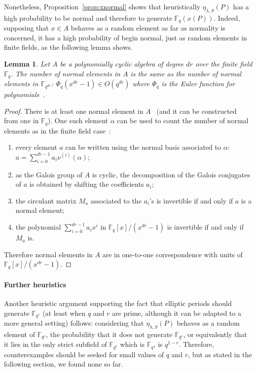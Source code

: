 \documentclass[12pt]{article}
\theoremstyle{plain}
\newtheorem{lemma}[theorem]{Lemma}
\theoremstyle{definition}
\def\F{\ensuremath{\mathbb{F}}}
\begin{document}
Nonetheless, Proposition~\ref{prop:xnormal} shows that heuristically
$\eta_{\lambda,S}(P)$ has a high probability to be normal and therefore
to generate $\F_q(x(P))$.
Indeed, supposing that $x \in A$ behaves as a random element
as far as normality is concerned, it has a high probability
of begin normal, just as random elements in finite fields,
as the following lemma shows.
\begin{lemma}
\label{lemma:euleralgebra}
Let $A$ be a polynomially cyclic algebra of degree $dr$
over the finite field $\F_q$.
The number of normal elements in $A$ is the same as the
number of normal elements in $\F_{q^{dr}}$:
$\Phi_q(x^{dr}-1) \in O(q^{dr})$ where $\Phi_q$ is the Euler function
for polynomials~\cite[Lemma~3.69]{lidl+niederreiter:2}.
\end{lemma}
\begin{proof}
There is at least one normal element in $A$~\cite[Theorem 4]{Mihailescu2010825}
(and it can be constructed from one in $\F_q$).
One such element $\alpha$ can be used to count the number of normal elements
as in the finite field case~\cite[Theorem~3.73]{lidl+niederreiter:2}:
\begin{enumerate}
\item every element $a$ can be written using the normal basis
associated to $\alpha$: $a = \sum_{i=0}^{dr-1} a_i \nu^{(i)}(\alpha)$;
\item as the Galois group of $A$ is cyclic, the decomposition
of the Galois conjugates of $a$ is obtained by shifting the coefficients $a_i$;
\item the circulant matrix $M_a$ associated to the $a_i$'s is invertible
if and only if $a$ is a normal element;
\item the polynomial $\sum_{i=0}^{dr-1} a_i x^i$ in $\F_q[x] / (x^{dr}-1)$
is invertible if and only if $M_a$ is.
\end{enumerate}
Therefore normal elements in $A$ are in one-to-one correspondence
with units of $\F_q[x] / (x^{dr}-1)$.
\end{proof}

\paragraph{Further heuristics}
Another heuristic argument supporting the fact that
elliptic periods should generate $\F_{q^r}$
(at least when $q$ and $r$ are prime, although it can be adapted to
a more general setting) follows:
considering that $\eta_{\lambda, S}(P)$ behaves as a random
element of $\F_{q^r}$, the probability that it does not
generate $\F_{q^r}$, or equivalently that it lies in
the only strict subfield of $\F_{q^r}$ which is $\F_q$,
is $q^{1-r}$.
Therefore, counterexamples should be seeked for small values
of $q$ and $r$, but as stated in the following section,
we found none so far.
\end{document}
